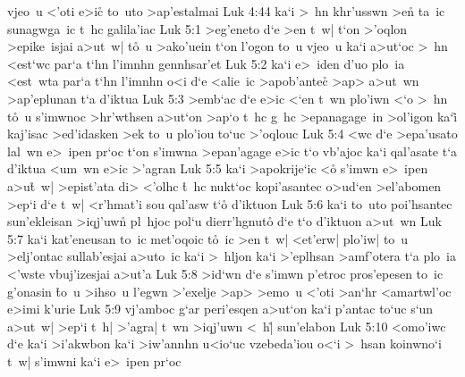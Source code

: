 vjeo~u
<'oti
e>ic\r{}
to~uto
>ap'estalmai\bibvsend
\vs Luk 4:44
ka`i
>~hn
khr'usswn
>en\r{}
ta~ic
sunagwga~ic
t~hc
galila'iac\bibvsend
\vs Luk 5:1
>eg'eneto
d`e
>en
t~w|
t`on
>'oqlon
>epike~isjai
a>ut~w|
t\r{o}~u
>ako'uein
t`on
l'ogon
to~u
vjeo~u
ka`i
a>ut`oc
>~hn
<est`wc
par`a
t`hn
l'imnhn
gennhsar'et\bibvsend
\vs Luk 5:2
ka`i
e>~iden
d'uo
plo~ia
<est~wta
par`a
t`hn
l'imnhn
o<i
d`e
<alie~ic
>apob'antec\r{}
>ap>
a>ut~wn
>ap'eplunan
t`a
d'iktua\bibvsend
\vs Luk 5:3
>emb`ac
d`e
e>ic
<`en
t~wn
plo'iwn
<`o
>~hn
t\r{o}~u
s'imwnoc
>hr'wthsen
a>ut`on
>ap`o
t~hc
g~hc
>epanagage~in
>ol'igon
ka`i\r{}
kaj'isac
>ed'idasken
>ek
to~u
plo'iou
to`uc
>'oqlouc\bibvsend
\vs Luk 5:4
<wc
d`e
>epa'usato
lal~wn
e>~ipen
pr`oc
t`on
s'imwna
>epan'agage
e>ic
t`o
vb'ajoc
ka`i
qal'asate
t`a
d'iktua
<um~wn
e>ic
>'agran\bibvsend
\vs Luk 5:5
ka`i
>apokrije`ic
<o\r{}
s'imwn
e>~ipen
a>u\r{t}~w|
>epist'ata
di>
<'olhc
\r{t}~hc
nukt`oc
kopi'asantec
o>ud`en
>el'abomen
>ep`i
d`e
t~w|
<r'hmat'i
sou
qal'asw
t`o\r{}
d'iktuon\bibvsend
\vs Luk 5:6
ka`i
to~uto
poi'hsantec
sun'ekleisan
>iqj'uwn\r{}
pl~hjoc
pol`u
dierr'hgnuto\r{}
d`e
t`o
d'iktuon
a>ut~wn\bibvsend
\vs Luk 5:7
ka`i
kat'eneusan
to~ic
met'oqoic
t\r{o}~ic
>en
t~w|
<et'erw|
plo'iw|
to~u
>elj'ontac
sullab'esjai
a>uto~ic
ka`i
>~hljon
ka`i
>'eplhsan
>amf'otera
t`a
plo~ia
<'wste
vbuj'izesjai
a>ut'a\bibvsend
\vs Luk 5:8
>id`wn
d`e
s'imwn
p'etroc
pros'epesen
to~ic
g'onasin
\r{t}o~u
>ihso~u
l'egwn
>'exelje
>ap>
>emo~u
<'oti
>an`hr
<amartwl'oc
e>imi
k'urie\bibvsend
\vs Luk 5:9
vj'amboc
g`ar
peri'esqen
a>ut`on
ka`i
p'antac
to`uc
s`un
a>ut~w|
>ep`i
t~h|
>'agra|
t~wn
>iqj'uwn
<~h|\r{}
sun'elabon\bibvsend
\vs Luk 5:10
<omo'iwc
d`e
ka`i
>i'akwbon
ka`i
>iw'annhn
u<io`uc
vzebeda'iou
o<`i
>~hsan
koinwno`i
t~w|
s'imwni
ka`i
e>~ipen
pr`oc
